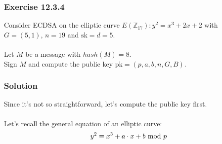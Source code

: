 \subsubsection{Exercise 12.3.4}
Consider ECDSA on the elliptic curve $E(\mathbb{Z}_{17}):y^2=x^3+2x+2$ with $G=(5,1)$, $n=19$ and $\text{sk}=d=5$.\\\\
Let $M$ be a message with $hash(M)=8$.\\
Sign $M$ and compute the public key $\text{pk}=(p,a,b,n,G,B)$.

\subsubsection*{Solution}
Since it's not so straightforward, let's compute the public key first.\\\\
Let's recall the general equation of an elliptic curve:
$$y^2\equiv x^3+a\cdot x+b\text{ mod } p$$
